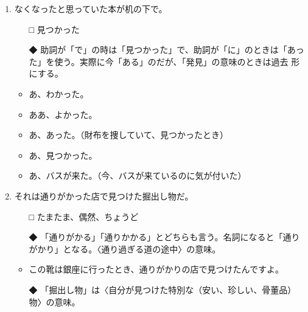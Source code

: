 \documentclass[
uplatex,
b5paper,
10pt,
dvipdfmx
]{jsbook}
\begin{document}
\begin{enumerate}
\item なくなったと思っていた本が机の下で\underline{\hspace{3zw}}。
\begin{itemize}
\item[□] 見つかった
\item[◆] 助詞が「で」の時は「見つかった」で、助詞が「に」のときは「あっ
	  た」を使う。実際に今「ある」のだが、「発見」の意味のときは過去
	  形にする。
\end{itemize}
\begin{itemize}
 \item あ、わかった。
 \item ああ、よかった。
 \item あ、あった。（財布を捜していて、見つかったとき）
 \item あ、見つかった。
 \item あ、バスが来た。（今、バスが来ているのに気が付いた）
\end{itemize}

\item それは\underline{\hspace{3zw}}通りがかった店で見つけた掘出し物だ。
\begin{itemize}
\item[□] たまたま、偶然、ちょうど
\item[◆] 「通りがかる」「通りかかる」とどちらも言う。名詞になると「通り
	   がかり」となる。〈通り過ぎる道の途中〉の意味。
\end{itemize}
\begin{itemize}
 \item この靴は銀座に行ったとき、通りがかりの店で見つけたんですよ。
\end{itemize}
\begin{itemize}
 \item[◆] 「掘出し物」は〈自分が見つけた特別な（安い、珍しい、骨董品）
	   物〉の意味。
\end{itemize}
\end{enumerate}

\end{document}
